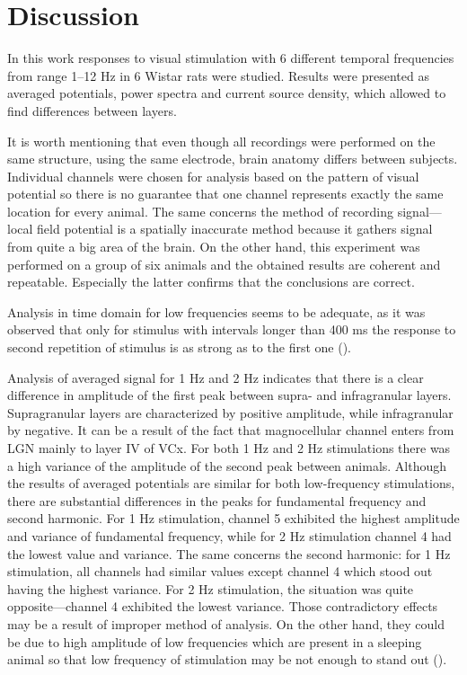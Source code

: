 \documentclass{pracalicmgr}
\begin{document}
    \chapter{Discussion}
    In this work responses to visual stimulation with 6 different temporal frequencies from range 1--12 Hz in 6 Wistar rats were studied. Results were presented as averaged potentials, power spectra and current source density, which allowed to find differences between layers.
    
    It is worth mentioning that even though all recordings were performed on the same structure, using the same electrode, brain anatomy differs between subjects. Individual channels were chosen for analysis based on the pattern of visual potential so there is no guarantee that one channel represents exactly the same location for every animal. The same concerns the method of recording signal---local field potential is a spatially inaccurate method because it gathers signal from quite a big area of the brain. On the other hand, this experiment was performed on a group of six animals and the obtained results are coherent and repeatable. Especially the latter confirms that the conclusions are correct. 
    
    Analysis in time domain for low frequencies seems to be adequate, as it was observed that only for stimulus with intervals longer than 400 ms the response to second repetition of stimulus is as strong as to the first one (\cite{retino}).
    
    Analysis of averaged signal for 1 Hz and 2 Hz indicates that there is a clear difference in amplitude of the first peak between supra- and infragranular layers. Supragranular layers are characterized by positive amplitude, while infragranular by negative. It can be a result of the fact that magnocellular channel enters from LGN mainly to layer IV of VCx. For both 1 Hz and 2 Hz stimulations there was a high variance of the amplitude of the second peak between animals. Although the results of averaged potentials are similar for both low-frequency stimulations, there are substantial differences in the peaks for fundamental frequency and second harmonic. For 1 Hz stimulation, channel 5 exhibited the highest amplitude and variance of fundamental frequency, while for 2 Hz stimulation channel 4 had the lowest value and variance. The same concerns the second harmonic: for 1 Hz stimulation, all channels had similar values except channel 4 which stood out having the highest variance. For 2 Hz stimulation, the situation was quite opposite---channel 4 exhibited the lowest variance. Those contradictory effects may be a result of improper method of analysis. On the other hand, they could be due to high amplitude of low frequencies which are present in a sleeping animal so that low frequency of stimulation may be not enough to stand out (\cite{sellers, ja}).
    
\end{document}
